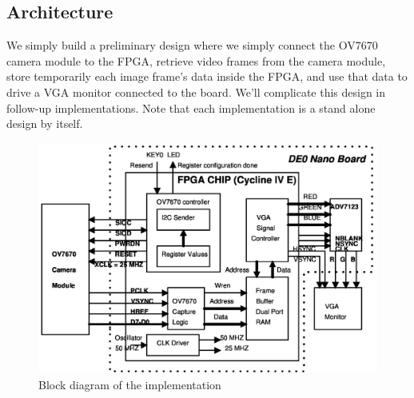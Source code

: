 \documentclass[a4paper]{article}
\begin{document}
\subsection{Architecture}
We simply build a preliminary design where we simply connect the OV7670 camera module to the FPGA, retrieve video frames from the camera module, store temporarily each image frame's data inside the FPGA, and use that data to drive a VGA monitor connected to the board. We'll complicate this design in follow-up implementations. Note that each implementation is a stand alone design by itself.
\begin{figure}[H]
    \centering
    \includegraphics[scale=0.3]{images/vlsi.jpg}
    \caption{Block diagram of the implementation}
    \label{fig:my_label}
\end{figure}
\printbibliography
\end{document}
